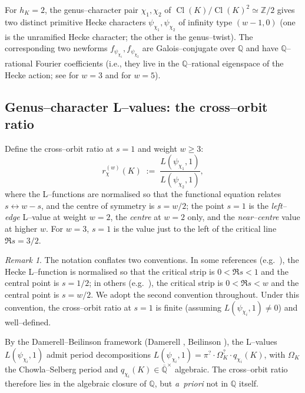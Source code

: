 \documentclass[11pt]{amsart}
\theoremstyle{definition}
\theoremstyle{remark}
\newtheorem{remark}[theorem]{Remark}
\DeclareMathOperator{\Cl}{Cl}
\newcommand{\Q}{\mathbb{Q}}
\newcommand{\Z}{\mathbb{Z}}
\begin{document}
For \(h_K = 2\), the genus--character pair \(\chi_1, \chi_2\) of
\(\Cl(K)/\Cl(K)^2 \simeq \Z/2\) gives two distinct primitive Hecke
characters \(\psi_{\chi_1}, \psi_{\chi_2}\) of infinity type
\((w{-}1, 0)\) (one is the unramified Hecke character; the other is
the genus--twist). The corresponding two newforms
\(f_{\psi_{\chi_1}}, f_{\psi_{\chi_2}}\) are Galois--conjugate over
\(\Q\) and have \(\Q\)--rational Fourier coefficients (i.e., they live
in the \(\Q\)--rational eigenspace of the Hecke action; see
\cite{Schutt2008} for \(w = 3\) and \cite{Remondiere2026} for \(w = 5\)).

\subsection{Genus--character L--values: the cross--orbit ratio}
\label{ssec:cross-orbit}
Define the cross--orbit ratio at \(s = 1\) and weight \(w \ge 3\):
\begin{equation}\label{eq:rchi-def-formal}
   r_\chi^{(w)}(K)
   \;:=\;
   \frac{L(\psi_{\chi_1}, 1)}{L(\psi_{\chi_2}, 1)} ,
\end{equation}
where the L--functions are normalised so that the functional equation
relates \(s \leftrightarrow w - s\), and the centre of symmetry is
\(s = w/2\); the point \(s = 1\) is the \emph{left--edge} L--value at
weight \(w = 2\), the \emph{centre} at \(w = 2\) only, and the
\emph{near--centre} value at higher \(w\). For \(w = 3\), \(s = 1\) is
the value just to the left of the critical line \(\Re s = 3/2\).

\begin{remark}\label{rem:weight-conv}
The notation conflates two conventions. In some references
(e.g.\ \cite{Shimura1971}), the Hecke L--function is normalised so
that the critical strip is \(0 < \Re s < 1\) and the central point is
\(s = 1/2\); in others (e.g.\ \cite{IwaniecKowalski2004}), the
critical strip is \(0 < \Re s < w\) and the central point is
\(s = w/2\). We adopt the second convention throughout. Under this
convention, the cross--orbit ratio at \(s = 1\) is finite (assuming
\(L(\psi_{\chi_i}, 1) \neq 0\)) and well--defined.
\end{remark}

By the Damerell--Beilinson framework (Damerell \cite{Damerell1971},
Beilinson \cite{Beilinson1984}), the L--values \(L(\psi_{\chi_i}, 1)\)
admit period decompositions
\(L(\psi_{\chi_i}, 1) = \pi^{?} \cdot \Omega_K^{?} \cdot
q_{\chi_i}(K)\), with \(\Omega_K\) the Chowla--Selberg period and
\(q_{\chi_i}(K) \in \overline{\Q}^\times\) algebraic. The cross--orbit
ratio therefore lies in the algebraic closure of \(\Q\), but
\emph{a~priori} not in \(\Q\) itself.
\end{document}

